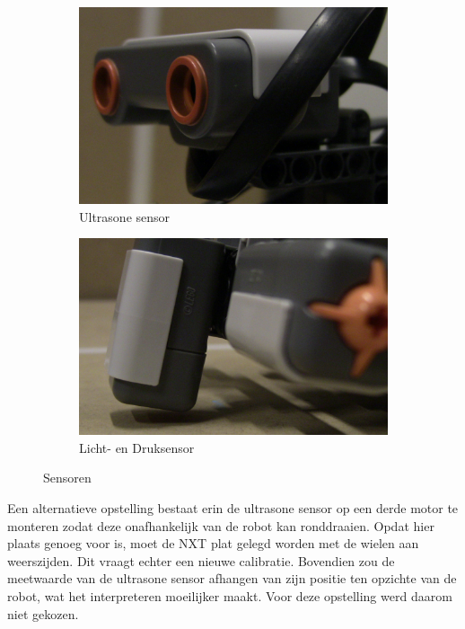 \documentclass[tt3]{penoverslag}
\begin{document}
\begin{figure}
        \centering
        \begin{subfigure}[h]{0.48\textwidth}
                \centering
                \includegraphics[width=\textwidth]{robotUS}
                \caption{Ultrasone sensor}
                \label{fig:US}
        \end{subfigure}%
        \begin{subfigure}[h]{0.48\textwidth}
                \centering
                \includegraphics[width=\textwidth]{robotLSTS}
                \caption{Licht- en Druksensor}
                \label{fig:LS+TS}
        \end{subfigure}
        \label{fig:sensors}
        \caption{Sensoren}
\end{figure}


Een alternatieve opstelling bestaat erin de ultrasone sensor op een derde motor te monteren zodat deze onafhankelijk van de robot kan ronddraaien. Opdat hier plaats genoeg voor is, moet de NXT plat gelegd worden met de wielen aan weerszijden. Dit vraagt echter een nieuwe calibratie. Bovendien zou de meetwaarde van de ultrasone sensor afhangen van zijn positie ten opzichte van de robot, wat het interpreteren moeilijker maakt. Voor deze opstelling werd daarom niet gekozen.
\end{document}

